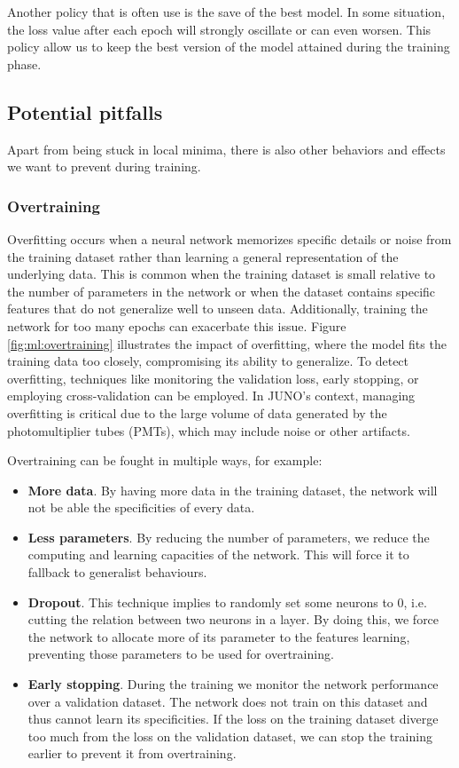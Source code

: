 \documentclass[../main.tex]{subfiles}
\begin{document}
Another policy that is often use is the save of the best model. In some situation, the loss value after each epoch will strongly oscillate or can even worsen. This policy allow us to keep the best version of the model attained during the training phase.

\subsection{Potential pitfalls}
\label{sec:ml:pitfall}

Apart from being stuck in local minima, there is also other behaviors and effects we want to prevent during training.

\subsubsection{Overtraining}

Overfitting occurs when a neural network memorizes specific details or noise from the training dataset rather than learning a general representation of the underlying data. This is common when the training dataset is small relative to the number of parameters in the network or when the dataset contains specific features that do not generalize well to unseen data. Additionally, training the network for too many epochs can exacerbate this issue. Figure \ref{fig:ml:overtraining} illustrates the impact of overfitting, where the model fits the training data too closely, compromising its ability to generalize.
To detect overfitting, techniques like monitoring the validation loss, early stopping, or employing cross-validation can be employed. In JUNO's context, managing overfitting is critical due to the large volume of data generated by the photomultiplier tubes (PMTs), which may include noise or other artifacts.

Overtraining can be fought in multiple ways, for example:
\begin{itemize}
  \item \textbf{More data}. By having more data in the training dataset, the network will not be able the specificities of every data.
  \item \textbf{Less parameters}. By reducing the number of parameters, we reduce the computing and learning capacities of the network. This will force it to fallback to generalist behaviours.
  \item \textbf{Dropout}. This technique implies to randomly set some neurons to 0, i.e. cutting the relation between two neurons in a layer. By doing this, we force the network to allocate more of its parameter to the features learning, preventing those parameters to be used for overtraining.
  \item \textbf{Early stopping}. During the training we monitor the network performance over a validation dataset. The network does not train on this dataset and thus cannot learn its specificities. If the loss on the training dataset diverge too much from the loss on the validation dataset, we can stop the training earlier to prevent it from overtraining.
\end{itemize}
\end{document}
